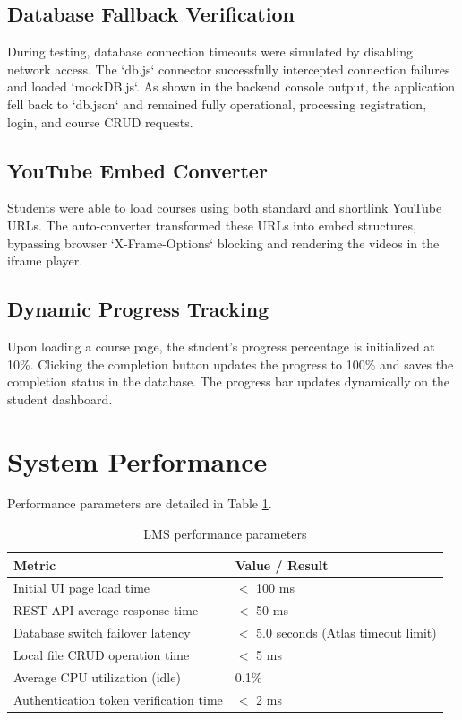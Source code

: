 \documentclass[12pt,a4paper]{report}
\begin{document}
\subsection{Database Fallback Verification}
During testing, database connection timeouts were simulated by disabling network access. The `db.js` connector successfully intercepted connection failures and loaded `mockDB.js`. As shown in the backend console output, the application fell back to `db.json` and remained fully operational, processing registration, login, and course CRUD requests.

\subsection{YouTube Embed Converter}
Students were able to load courses using both standard and shortlink YouTube URLs. The auto-converter transformed these URLs into embed structures, bypassing browser `X-Frame-Options` blocking and rendering the videos in the iframe player.

\subsection{Dynamic Progress Tracking}
Upon loading a course page, the student's progress percentage is initialized at 10\%. Clicking the completion button updates the progress to 100\% and saves the completion status in the database. The progress bar updates dynamically on the student dashboard.

\section{System Performance}
Performance parameters are detailed in Table \ref{tab:performance}.

\begin{table}[h!]
\centering
\begin{tabular}{|p{5cm}|p{8cm}|}
\hline
\textbf{Metric} & \textbf{Value / Result} \\
\hline
Initial UI page load time & $<$ 100 ms \\
\hline
REST API average response time & $<$ 50 ms \\
\hline
Database switch failover latency & $<$ 5.0 seconds (Atlas timeout limit) \\
\hline
Local file CRUD operation time & $<$ 5 ms \\
\hline
Average CPU utilization (idle) & 0.1\% \\
\hline
Authentication token verification time & $<$ 2 ms \\
\hline
\end{tabular}
\caption{LMS performance parameters}
\label{tab:performance}
\end{table}
\end{document}
